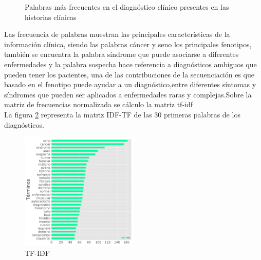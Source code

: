 \begin{figure}[H]
	\centering
	\caption{Palabras más frecuentes en el diagnóstico clínico  presentes en las historias clínicas } \label{fig:sin}
\end{figure} 

Las frecuencia de palabras muestran las principales características de la información clínica, siendo las palabras cáncer y seno los principales fenotipos, también se encuentra la palabra síndrome que puede asociarse a diferentes  enfermedades y la palabra sospecha hace referencia a diagnósticos ambiguos que pueden tener los pacientes, una de las contribuciones de la secuenciación es que basado en el fenotipo puede ayudar a un diagnóstico,entre diferentes síntomas y síndromes que pueden ser aplicados a enfermedades raras y complejas\cite{Tetreault2015a}.Sobre  la matriz  de frecuencias normalizada se cálculo la matriz tf-idf \\

La figura \ref{fig:IDFTF} representa la matriz IDF-TF de las 30 primeras palabras de los diagnósticos.  

\begin{figure}[H] 
	\centering
	\includegraphics[width=0.5\textwidth]{Kap4/tfidf.pdf}
	\caption{TF-IDF} 
	\label{fig:IDFTF}
\end{figure}

